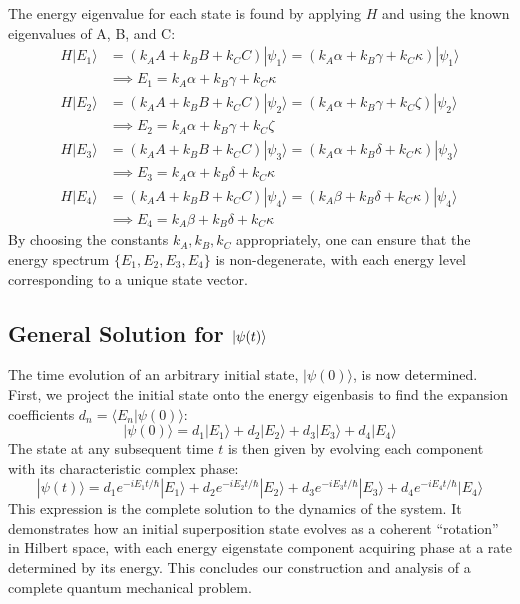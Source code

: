 \documentclass[11pt,a4paper]{article}
\begin{document}
  The energy eigenvalue for each state is found by applying $H$ and using the
  known eigenvalues of A, B, and C:
  \begin{align*}
    H |E_1\rangle &= (k_A A + k_B B + k_C C)|\psi_1\rangle = (k_A\alpha + k_B\gamma + k_C\kappa) |\psi_1\rangle \\
                  &\implies E_1 = k_A\alpha + k_B\gamma + k_C\kappa \\[.5em]
    H |E_2\rangle &= (k_A A + k_B B + k_C C)|\psi_2\rangle = (k_A\alpha + k_B\gamma + k_C\zeta) |\psi_2\rangle \\
                  &\implies E_2 = k_A\alpha + k_B\gamma + k_C\zeta \\[.5em]
    H |E_3\rangle &= (k_A A + k_B B + k_C C)|\psi_3\rangle = (k_A\alpha + k_B\delta + k_C\kappa) |\psi_3\rangle \\
                  &\implies E_3 = k_A\alpha + k_B\delta + k_C\kappa \\[.5em]
    H |E_4\rangle &= (k_A A + k_B B + k_C C)|\psi_4\rangle = (k_A\beta + k_B\delta + k_C\kappa) |\psi_4\rangle \\
                  &\implies E_4 = k_A\beta + k_B\delta + k_C\kappa
  \end{align*}
  By choosing the constants $k_A, k_B, k_C$ appropriately, one can ensure that the
  energy spectrum $\{E_1, E_2, E_3, E_4\}$ is non-degenerate, with each
  energy level corresponding to a unique state vector.

  \subsection{General Solution for \texorpdfstring{$\ket{\psi(t)}$}{ψ(t)}}

  The time evolution of an arbitrary initial state, $|\psi(0)\rangle$, is now
  determined. First, we project the initial state onto the energy eigenbasis to
  find the expansion coefficients $d_n = \langle E_n|\psi(0)\rangle$:
  \begin{equation*}
    |\psi(0)\rangle = d_1 |E_1\rangle + d_2 |E_2\rangle + d_3 |E_3\rangle + d_4
    |E_4\rangle
  \end{equation*}
  The state at any subsequent time $t$ is then given by evolving each component
  with its characteristic complex phase:
  \begin{equation*}
    |\psi(t)\rangle = d_1e^{-iE_1t/\hbar} |E_1\rangle + d_2e^{-iE_2t/\hbar}
    |E_2\rangle + d_3e^{-iE_3t/\hbar} |E_3\rangle + d_4e^{-iE_4t/\hbar} |E_4\rangle
  \end{equation*}
  This expression is the complete solution to the dynamics of the system. It
  demonstrates how an initial superposition state evolves as a coherent
  ``rotation'' in Hilbert space, with each energy eigenstate component acquiring
  phase at a rate determined by its energy. This concludes our construction and
  analysis of a complete quantum mechanical problem.
\end{document}
